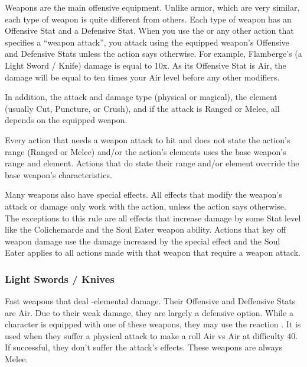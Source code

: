\begin{multicols}{2}
Weapons are the main offensive equipment.  Unlike armor, which are very similar, each type of weapon is quite different from others.  Each type of weapon has an Offensive Stat and a Defensive Stat.  When you use the  or any other action that specifies a ``weapon attack'', you attack using the equipped weapon's Offensive and Defensive Stats unless the action says otherwise.  For example, Flamberge's (a Light Sword / Knife) damage is equal to 10x.  As its Offensive Stat is Air, the damage will be equal to ten times your Air level before any other modifiers.

In addition, the attack and damage type (physical or magical), the element (usually Cut, Puncture, or Crush), and if the attack is Ranged or Melee, all depends on the equipped weapon.

Every action that needs a weapon attack to hit and does not state the action's range (Ranged or Melee) and/or the action's elements uses the base weapon's range and element.  Actions that do state their range and/or element override the base weapon's characteristics.

Many weapons also have special effects.  All effects that modify the weapon's attack or damage only work with the  action, unless the action says otherwise.  The exceptions to this rule are all effects that increase damage by some Stat level like the Colichemarde and the Soul Eater weapon ability.  Actions that key off weapon damage use the damage increased by the special effect and the Soul Eater applies to all actions made with that weapon that require a weapon attack.
\end{multicols}

\begin{center}
\end{center}
\clearpage
\subsubsection{Light Swords / Knives}

Fast weapons that deal -elemental damage.  Their Offensive and Deffensive Stats are Air.  Due to their weak damage, they are largely a defensive option.  While a character is equipped with one of these weapons, they may use the reaction .  It is used when they suffer a physical attack to make a roll Air vs Air at difficulty 40.  If successful, they don't suffer the attack's effects.  These weapons are always Melee.

